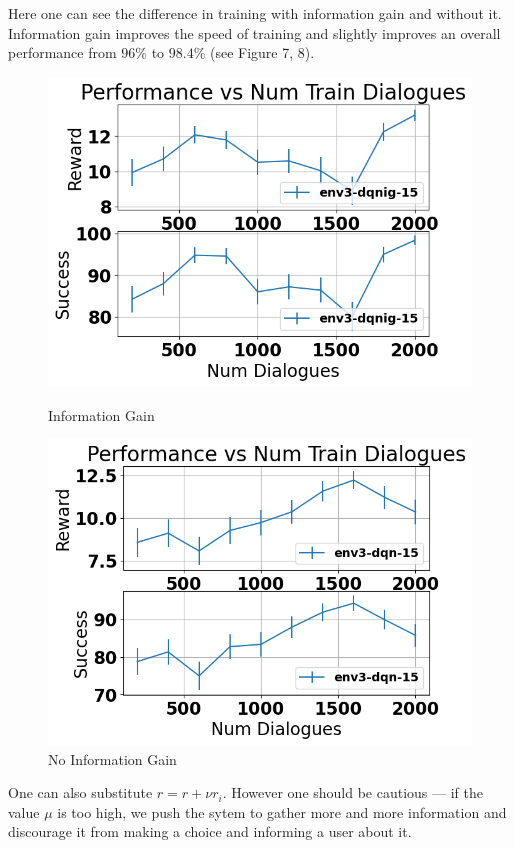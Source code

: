\documentclass[12pt,titlepage,a4paper]{article}
\begin{document}
Here one can see the difference in training with information gain and without it. Information gain improves the speed of training and slightly improves an overall performance from $96\%$  to $98.4\%$ (see Figure 7, 8).

\begin{figure}[!htb]
      \includegraphics[width=\linewidth]{env3-ig-CamRestaurants.png}
      \caption{Information Gain}
    \endminipage\hfill
      \includegraphics[width=\linewidth]{env3-CamRestaurants.png}
      \caption{No Information Gain}
    \endminipage
\end{figure}

One can also substitute $r = r + \nu r_i$. However one should be cautious --- if the value $\mu$ is too high, we push the sytem to gather more and more information and discourage it from making a choice and informing a user about it. 
\end{document}
